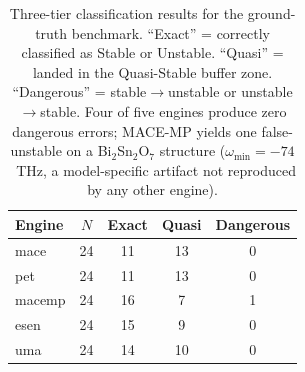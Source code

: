 \begin{table}[htbp]
\centering
\caption{Three-tier classification results for the ground-truth benchmark. ``Exact'' = correctly classified as Stable or Unstable. ``Quasi'' = landed in the Quasi-Stable buffer zone. ``Dangerous'' = stable$\to$unstable or unstable$\to$stable. Four of five engines produce zero dangerous errors; MACE-MP yields one false-unstable on a Bi$_2$Sn$_2$O$_7$ structure ($\omega_\mathrm{min}=-74$~THz, a model-specific artifact not reproduced by any other engine).}
\label{tab:si_three_tier}
\begin{tabular}{lcccc}
\toprule
Engine & $N$ & Exact & Quasi & Dangerous \\
\midrule
mace & 24 & 11 & 13 & 0 \\
pet & 24 & 11 & 13 & 0 \\
macemp & 24 & 16 & 7 & 1 \\
esen & 24 & 15 & 9 & 0 \\
uma & 24 & 14 & 10 & 0 \\
\bottomrule
\end{tabular}
\end{table}